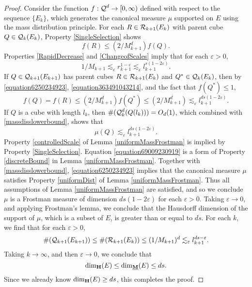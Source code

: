 \begin{proof}
	Consider the function $f: \operatorname{\mathcal{Q}}^d \to [0,\infty)$ defined with respect to the sequence $\{ E_k \}$, which generates the canonical measure $\mu$ supported on $E$ using the mass distribution principle. For each $R \in \operatorname{\mathcal{R}}_{k+1}(E_k)$ with parent cube $Q \in \operatorname{\mathcal{Q}}_k(E_k)$, Property \ref{SingleSelection} shows
	\begin{equation} \label{equation6250234923} f(R) \leq (2/M_{k+1}^d) f(Q). \end{equation}
	Properties \ref{RapidDecrease} and \ref{ChangeofScales} imply that for each $\varepsilon > 0$,
	\begin{equation} \label{equation363491043214} 1/M_{k+1} \lesssim_\varepsilon r_{k+1}^{1 - \varepsilon} \lesssim_\varepsilon l_{k+1}^{s(1  - 2 \varepsilon)}. \end{equation}
	If $Q \in \operatorname{\mathcal{Q}}_{k+1}(E_{k+1})$ has parent cubes $R \in \operatorname{\mathcal{R}}_{k+1}(E_k)$ and $Q^* \in \operatorname{\mathcal{Q}}_k(E_k)$, then by \eqref{equation6250234923}, \eqref{equation363491043214}, and the fact that $f(Q^*) \leq 1$,
	\begin{equation} \label{equation120492309562} f(Q) = f(R) \leq (2/M_{k+1}^d) f(Q^*) \leq (2/M_{k+1}^d) \lesssim_{\varepsilon} l_{k+1}^{ds(1 - 2\varepsilon)}. \end{equation}
	If $Q$ is a cube with length $l_k$, then $\#(\operatorname{\mathcal{Q}}_k^d(Q(l_k))) = O_d(1)$, which combined with \eqref{massdisslowerbound}, shows that
	\begin{equation} \label{equation69009230919} \mu(Q) \lesssim_\varepsilon l_{k+1}^{ds(1-2\varepsilon)}. \end{equation}
	Property \ref{controlledScale} of Lemma \ref{uniformMassFrostman} is implied by Property \ref{SingleSelection}.  Equation \eqref{equation69009230919} is a form of Property \ref{discreteBound} in Lemma \ref{uniformMassFrostman}. Together with \eqref{massdisslowerbound}, \eqref{equation6250234923} implies that the canonical measure $\mu$ satisfies Property \ref{uniformDist} of Lemma \ref{uniformMassFrostman}. Thus all assumptions of Lemma \ref{uniformMassFrostman} are satisfied, and so we conclude $\mu$ is a Frostman measure of dimension $ds(1 - 2\varepsilon)$ for each $\varepsilon > 0$. Taking $\varepsilon \to 0$, and applying Frostman's lemma, we conclude that the Hausdorff dimension of the support of $\mu$, which is a subset of $E$, is greater than or equal to $ds$. For each $k$, we find that for each $\varepsilon > 0$,
	\[ \#(\operatorname{\mathcal{Q}}_{k+1}(E_{k+1})) \leq \#(\operatorname{\mathcal{R}}_{k+1}(E_k)) \leq (1/M_{k+1})^d \lesssim_\varepsilon l_{k+1}^{ds - \varepsilon}. \]
	Taking $k \to \infty$, and then $\varepsilon \to 0$, we conclude that
	\[ \operatorname{\dim_{\mathbf{H}}}(E) \leq \operatorname{\dim_{\underline{\mathbf{M}}}}(E) \leq ds. \]
	Since we already know $\operatorname{\dim_{\mathbf{H}}}(E) \geq ds$, this completes the proof.
\end{proof}


